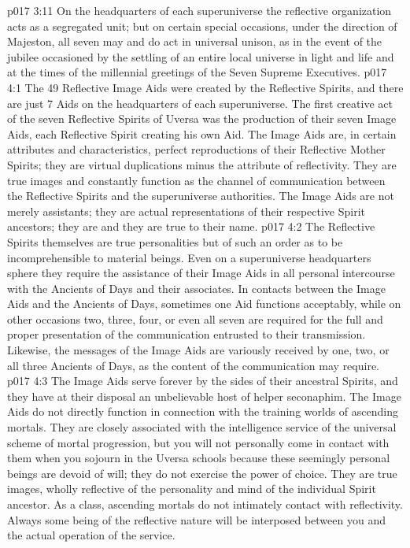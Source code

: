 \vs p017 3:11 On the headquarters of each superuniverse the reflective organization acts as a segregated unit; but on certain special occasions, under the direction of Majeston, all seven may and do act in universal unison, as in the event of the jubilee occasioned by the settling of an entire local universe in light and life and at the times of the millennial greetings of the Seven Supreme Executives.
\vs p017 4:1 The 49 Reflective Image Aids were created by the Reflective Spirits, and there are just 7 Aids on the headquarters of each superuniverse. The first creative act of the seven Reflective Spirits of Uversa was the production of their seven Image Aids, each Reflective Spirit creating his own Aid. The Image Aids are, in certain attributes and characteristics, perfect reproductions of their Reflective Mother Spirits; they are virtual duplications minus the attribute of reflectivity. They are true images and constantly function as the channel of communication between the Reflective Spirits and the superuniverse authorities. The Image Aids are not merely assistants; they are actual representations of their respective Spirit ancestors; they are  and they are true to their name.
\vs p017 4:2 The Reflective Spirits themselves are true personalities but of such an order as to be incomprehensible to material beings. Even on a superuniverse headquarters sphere they require the assistance of their Image Aids in all personal intercourse with the Ancients of Days and their associates. In contacts between the Image Aids and the Ancients of Days, sometimes one Aid functions acceptably, while on other occasions two, three, four, or even all seven are required for the full and proper presentation of the communication entrusted to their transmission. Likewise, the messages of the Image Aids are variously received by one, two, or all three Ancients of Days, as the content of the communication may require.
\vs p017 4:3 The Image Aids serve forever by the sides of their ancestral Spirits, and they have at their disposal an unbelievable host of helper seconaphim. The Image Aids do not directly function in connection with the training worlds of ascending mortals. They are closely associated with the intelligence service of the universal scheme of mortal progression, but you will not personally come in contact with them when you sojourn in the Uversa schools because these seemingly personal beings are devoid of will; they do not exercise the power of choice. They are true images, wholly reflective of the personality and mind of the individual Spirit ancestor. As a class, ascending mortals do not intimately contact with reflectivity. Always some being of the reflective nature will be interposed between you and the actual operation of the service.
